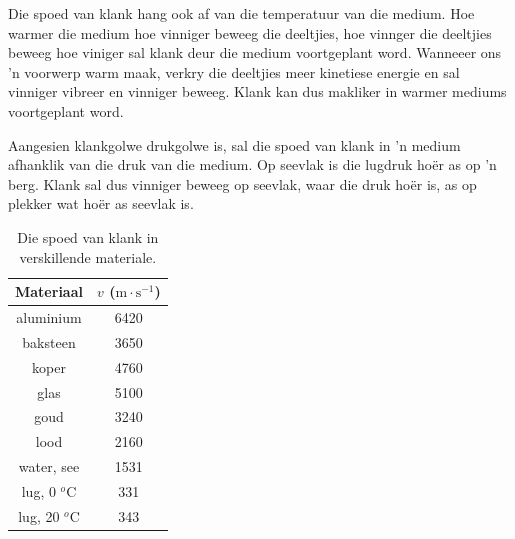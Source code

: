 
\begin{minipage}[t]{.5\textwidth}
Die spoed van klank hang ook af van die temperatuur van die medium. Hoe warmer die medium hoe vinniger beweeg die deeltjies, hoe vinnger die deeltjies beweeg hoe viniger sal klank deur die medium voortgeplant word. Wanneeer ons 'n voorwerp warm maak, verkry die deeltjies meer kinetiese energie en sal vinniger vibreer en vinniger beweeg. Klank kan dus makliker in warmer mediums voortgeplant word.\par  

Aangesien klankgolwe drukgolwe is, sal die spoed van klank in 'n medium afhanklik van die druk van die medium. Op seevlak is die lugdruk ho\"{e}r as op 'n berg. Klank sal dus vinniger beweeg op seevlak, waar die druk ho\"{e}r is, as op plekker wat ho\"{e}r as seevlak is.  
\end{minipage}
\begin{minipage}[t]{.5\textwidth}
\begin{center}
\begin{table}[H]
\centering
 \begin{tabular}{|c|c|}\hline
Materiaal	& $v$ ($\text{m}\cdot \text{s}^{-1}$)\\ \hline \hline
aluminium	&6420 \\ \hline
baksteen	&3650 \\ \hline
koper	&4760	 	 \\ \hline
glas &5100	 \\ \hline 	 	 
goud	&3240	 \\ \hline 	
lood	&2160	 \\ \hline 
water, see	&1531 \\ \hline
lug, 0 $^o$C&331 \\ \hline
lug, 20 $^o$C&343 \\ \hline
\end{tabular}
\caption{Die spoed van klank in verskillende materiale.}
\end{table}
\end{center}
\end{minipage}

